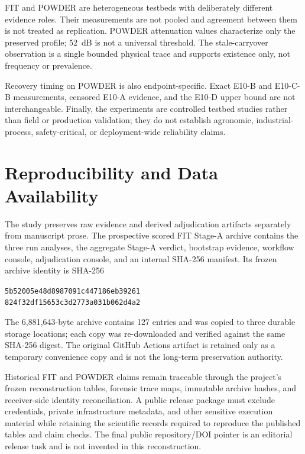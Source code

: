 \documentclass[journal]{IEEEtran}
\begin{document}
FIT and POWDER are heterogeneous testbeds with deliberately different evidence roles. Their measurements are not pooled and agreement between them is not treated as replication. POWDER attenuation values characterize only the preserved profile; 52~dB is not a universal threshold. The stale-carryover observation is a single bounded physical trace and supports existence only, not frequency or prevalence.

Recovery timing on POWDER is also endpoint-specific. Exact E10-B and E10-C-B measurements, censored E10-A evidence, and the E10-D upper bound are not interchangeable. Finally, the experiments are controlled testbed studies rather than field or production validation; they do not establish agronomic, industrial-process, safety-critical, or deployment-wide reliability claims.

\section{Reproducibility and Data Availability}
\label{sec:repro}

The study preserves raw evidence and derived adjudication artifacts separately from manuscript prose. The prospective scored FIT Stage-A archive contains the three run analyses, the aggregate Stage-A verdict, bootstrap evidence, workflow console, adjudication console, and an internal SHA-256 manifest. Its frozen archive identity is SHA-256
\begin{center}
\small\texttt{5b52005e48d8987091c447186eb39261}\\
\texttt{824f32df15653c3d2773a031b062d4a2}
\end{center}
The 6,881,643-byte archive contains 127 entries and was copied to three durable storage locations; each copy was re-downloaded and verified against the same SHA-256 digest. The original GitHub Actions artifact is retained only as a temporary convenience copy and is not the long-term preservation authority.

Historical FIT and POWDER claims remain traceable through the project's frozen reconstruction tables, forensic trace maps, immutable archive hashes, and receiver-side identity reconciliation. A public release package must exclude credentials, private infrastructure metadata, and other sensitive execution material while retaining the scientific records required to reproduce the published tables and claim checks. The final public repository/DOI pointer is an editorial release task and is not invented in this reconstruction.
\end{document}
